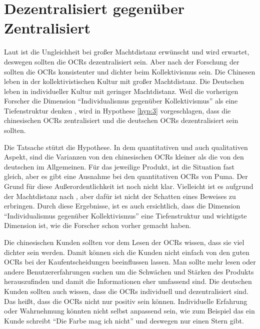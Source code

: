 \section{Dezentralisiert gegenüber Zentralisiert}
Laut \citet{hofstede2013interkulturelle} ist die Ungleichheit bei großer Machtdistanz erwünscht und wird erwartet, deswegen sollten die \ac{OCRs} dezentralisiert sein. Aber nach der Forschung der \citeauthor{Luo2014} sollten die \ac{OCRs} konsistenter und dichter beim Kollektivismus sein. Die Chinesen leben in der kollektivistischen Kultur mit großer Machtdistanz. Die Deutschen leben in individueller Kultur mit geringer Machtdistanz. Weil die vorherigen Forscher die Dimension ``Individualismus gegenüber Kollektivismus'' als eine Tiefenstruktur denken \citep{grennfield2000approaches,sia2009web, triandis2001individualism}, wird in Hypothese \ref{hyp:3} vorgeschlagen, dass die chinesischen \ac{OCRs} zentralisiert und die deutschen \ac{OCRs} dezentralisiert sein sollten.

Die Tatsache stützt die Hypothese. In dem quantitativen und auch qualitativen Aspekt, sind die Varianzen von den chinesischen \ac{OCRs} kleiner als die von den deutschen im Allgemeinen. Für das jeweilige Produkt, ist die Situation fast gleich, aber es gibt eine Ausnahme bei den quantitativen \ac{OCRs} von Puma. Der Grund für diese Außerordentlichkeit ist noch nicht klar. Vielleicht ist es aufgrund der Machtdistanz nach \citet{hofstede2013interkulturelle}, aber dafür ist nicht der Schatten eines Beweises zu erbringen. Durch diese Ergebnisse, ist es auch ersichtlich, dass die Dimension ``Individualismus gegenüber Kollektivismus'' eine Tiefenstruktur und wichtigste Dimension ist, wie die Forscher schon vorher gemacht haben. 

Die chinesischen Kunden sollten vor dem Lesen der \ac{OCRs} wissen, dass sie viel dichter sein werden. Damit können sich die Kunden nicht einfach von den guten \ac{OCRs} bei der Kaufentscheidungen beeinflussen lassen. Man sollte mehr lesen oder andere Benutzererfahrungen suchen um die Schwächen und Stärken des Produkts herauszufinden und damit die Informationen eher umfassend sind. Die deutschen Kunden sollten auch wissen, dass die \ac{OCRs} individuell und dezentralisiert sind. Das heißt, dass die \ac{OCRs} nicht nur positiv sein können. Individuelle Erfahrung oder Wahrnehmung könnten nicht selbst anpassend sein, wie zum Beispiel das ein Kunde schreibt ``Die Farbe mag ich nicht'' und deswegen nur einen Stern gibt. 

